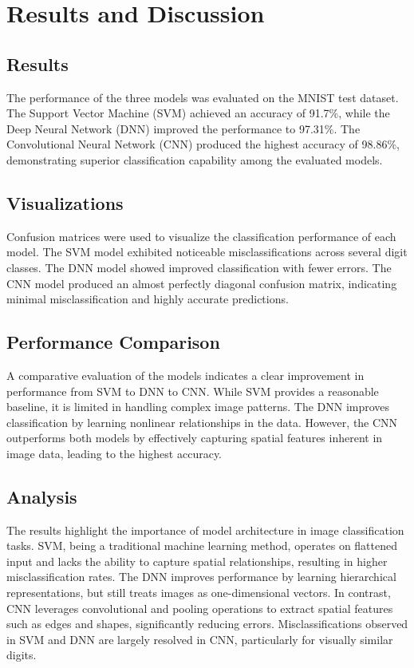 \documentclass[11pt,a4paper]{article}
\begin{document}
	\section{Results and Discussion}
	
	\subsection{Results}
	
	The performance of the three models was evaluated on the MNIST test dataset. The Support Vector Machine (SVM) achieved an accuracy of 91.7\%, while the Deep Neural Network (DNN) improved the performance to 97.31\%. The Convolutional Neural Network (CNN) produced the highest accuracy of 98.86\%, demonstrating superior classification capability among the evaluated models.
	
	\subsection{Visualizations}
	
	Confusion matrices were used to visualize the classification performance of each model. The SVM model exhibited noticeable misclassifications across several digit classes. The DNN model showed improved classification with fewer errors. The CNN model produced an almost perfectly diagonal confusion matrix, indicating minimal misclassification and highly accurate predictions.
	
	\subsection{Performance Comparison}
	
	A comparative evaluation of the models indicates a clear improvement in performance from SVM to DNN to CNN. While SVM provides a reasonable baseline, it is limited in handling complex image patterns. The DNN improves classification by learning nonlinear relationships in the data. However, the CNN outperforms both models by effectively capturing spatial features inherent in image data, leading to the highest accuracy.
	
	\subsection{Analysis}
	
	The results highlight the importance of model architecture in image classification tasks. SVM, being a traditional machine learning method, operates on flattened input and lacks the ability to capture spatial relationships, resulting in higher misclassification rates. The DNN improves performance by learning hierarchical representations, but still treats images as one-dimensional vectors. In contrast, CNN leverages convolutional and pooling operations to extract spatial features such as edges and shapes, significantly reducing errors. Misclassifications observed in SVM and DNN are largely resolved in CNN, particularly for visually similar digits.
	
\end{document}
